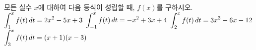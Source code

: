 모든 실수 $x$에 대하여 다음 등식이 성립할 때, $f(x)$를 구하시오.
 $\displaystyle\int_{1}^{x}f(t)\mkern3mu dt=2x^2-5x+3$
 $\displaystyle\int_{-1}^{x}f(t)\mkern3mu dt=-x^2+3x+4$
 $\displaystyle\int_{2}^{x}f(t)\mkern3mu dt=3x^3-6x-12$
 $\displaystyle\int_{3}^{x}f(t)\mkern3mu dt=(x+1)(x-3)$
